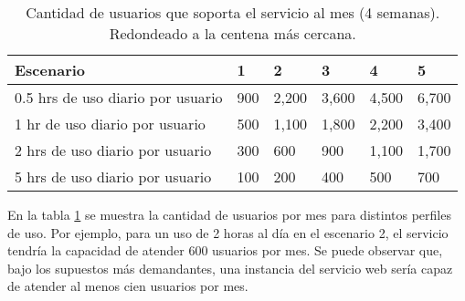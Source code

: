 \begin{table}[!ht]
    \centering
    \caption{ Cantidad de usuarios que soporta el servicio al mes (4 semanas).
        Redondeado a la centena más cercana. }
    \begin{tabular}{|l|l|l|l|l|l|}
    \hline
        Escenario & 1 & 2 & 3 & 4 & 5 \\ \hline
        0.5 hrs de uso diario por usuario & 900 & 2,200 & 3,600 & 4,500 & 6,700 \\ \hline
          1 hr  de uso diario por usuario & 500 & 1,100 & 1,800 & 2,200 & 3,400 \\ \hline
          2 hrs de uso diario por usuario & 300 & 600 & 900 & 1,100 & 1,700 \\ \hline
          5 hrs de uso diario por usuario & 100 & 200 & 400 & 500 & 700 \\ \hline
    \end{tabular}
    \label{CPCU}
\end{table}

En la tabla \ref{CPCU} se muestra la cantidad de usuarios por mes para distintos
perfiles de uso. Por ejemplo, para un uso de 2 horas al día en el escenario 2,
el servicio tendría la capacidad de atender 600 usuarios por mes. Se puede
observar que, bajo los supuestos más demandantes, una instancia del servicio web
sería capaz de atender al menos cien usuarios por mes.
